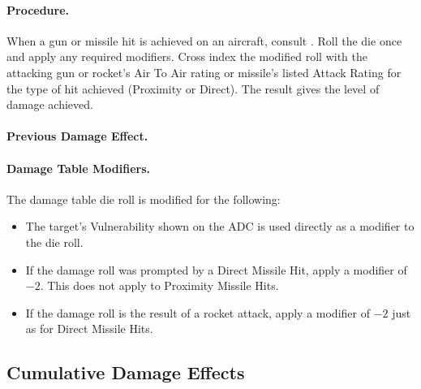 \paragraph{Procedure.} When a gun or missile hit is achieved on an aircraft, consult . Roll the die once and apply any required modifiers. Cross index the modified roll with the attacking gun or rocket's Air To Air rating or missile's listed Attack Rating for the type of hit achieved (Proximity or Direct). The result gives the level of damage achieved.

\paragraph{Previous Damage Effect.} 

\paragraph{Damage Table Modifiers.} The damage table die roll is modified for the following:

\begin{itemize}

    \item{} The target's Vulnerability shown on the ADC is used directly as a modifier to the die roll.
    
    \item{} If the damage roll was prompted by a Direct Missile Hit, apply a modifier of $-2$. This does not apply to Proximity Missile Hits.
    
    \item{} If the damage roll is the result of a rocket attack, apply a modifier of $-2$ just as for Direct Missile Hits.
    
\end{itemize}

\subsection{Cumulative Damage Effects}


